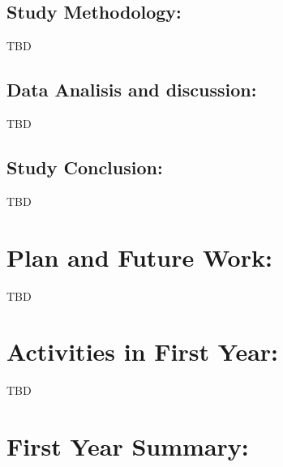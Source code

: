 \subsection{Study Methodology:}
TBD
\subsection{Data Analisis and discussion:}
TBD
\subsection{Study Conclusion:}
TBD

\section{Plan and Future Work:}
TBD

\section{Activities in First Year:}
TBD


\section{First Year Summary:}

